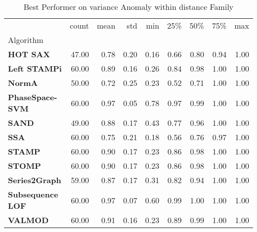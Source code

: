 \begin{table}
\caption{Best Performer on variance Anomaly within distance Family}
\label{tab:bp-variance_distance}
\begin{tabular}{lrrrrrrrr}
\toprule
 & count & mean & std & min & 25\% & 50\% & 75\% & max \\
Algorithm &  &  &  &  &  &  &  &  \\
\midrule
\textbf{HOT SAX} & 47.00 & 0.78 & 0.20 & 0.16 & 0.66 & 0.80 & 0.94 & 1.00 \\
\textbf{Left STAMPi} & 60.00 & 0.89 & 0.16 & 0.26 & 0.84 & 0.98 & 1.00 & 1.00 \\
\textbf{NormA} & 50.00 & 0.72 & 0.25 & 0.23 & 0.52 & 0.71 & 1.00 & 1.00 \\
\textbf{PhaseSpace-SVM} & 60.00 & 0.97 & 0.05 & 0.78 & 0.97 & 0.99 & 1.00 & 1.00 \\
\textbf{SAND} & 49.00 & 0.88 & 0.17 & 0.43 & 0.77 & 0.96 & 1.00 & 1.00 \\
\textbf{SSA} & 60.00 & 0.75 & 0.21 & 0.18 & 0.56 & 0.76 & 0.97 & 1.00 \\
\textbf{STAMP} & 60.00 & 0.90 & 0.17 & 0.23 & 0.86 & 0.98 & 1.00 & 1.00 \\
\textbf{STOMP} & 60.00 & 0.90 & 0.17 & 0.23 & 0.86 & 0.98 & 1.00 & 1.00 \\
\textbf{Series2Graph} & 59.00 & 0.87 & 0.17 & 0.31 & 0.82 & 0.94 & 1.00 & 1.00 \\
\textbf{Subsequence LOF} & 60.00 & 0.97 & 0.07 & 0.60 & 0.99 & 1.00 & 1.00 & 1.00 \\
\textbf{VALMOD} & 60.00 & 0.91 & 0.16 & 0.23 & 0.89 & 0.99 & 1.00 & 1.00 \\
\bottomrule
\end{tabular}
\end{table}
